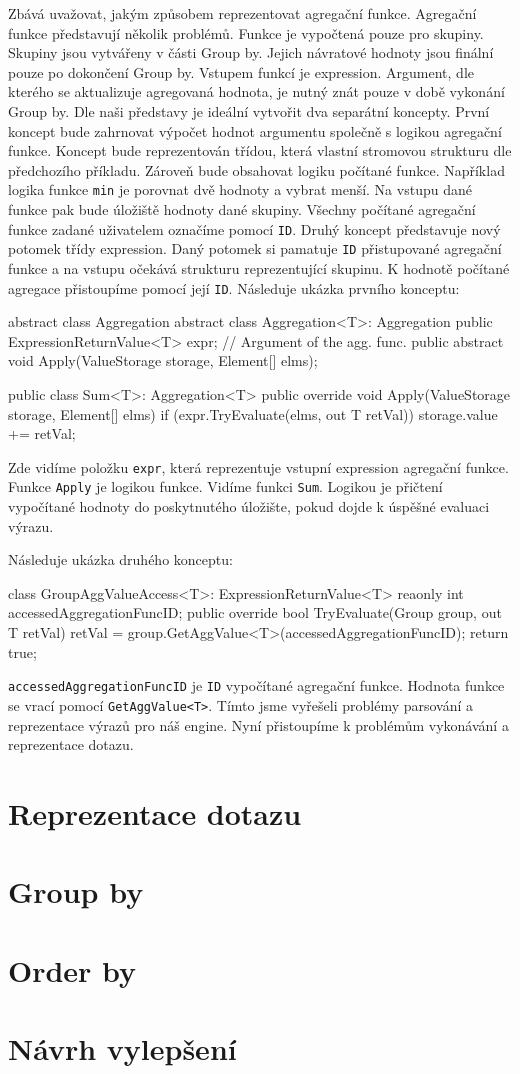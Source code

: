 Zbává uvažovat, jakým způsobem reprezentovat agregační funkce.
Agregační funkce představují několik problémů.
Funkce je vypočtená pouze pro skupiny. 
Skupiny jsou vytvářeny v části Group by.
Jejich návratové hodnoty jsou finální pouze po dokončení Group by. 
Vstupem funkcí je expression.
Argument, dle kterého se aktualizuje agregovaná hodnota, je nutný znát pouze v době vykonání Group by.
Dle naši představy je ideální vytvořit dva separátní koncepty.
První koncept bude zahrnovat výpočet hodnot argumentu společně s logikou agregační funkce.
Koncept bude reprezentován třídou, která vlastní stromovou strukturu dle předchozího příkladu.
Zároveň bude obsahovat logiku počítané funkce.
Například logika funkce \verb+min+ je porovnat dvě hodnoty a vybrat menší.
Na vstupu dané funkce pak bude úložiště hodnoty dané skupiny.
Všechny počítané agregační funkce zadané uživatelem označíme pomocí \verb+ID+.
Druhý koncept představuje nový potomek třídy expression.
Daný potomek si pamatuje \verb+ID+ přistupované agregační funkce a na vstupu očekává strukturu reprezentující skupinu.
K hodnotě počítané agregace přistoupíme pomocí její \verb+ID+.
Následuje ukázka prvního konceptu:
\begin{code}
abstract class Aggregation { }
abstract class Aggregation<T>: Aggregation {
  public ExpressionReturnValue<T> expr; // Argument of the agg. func.
  public abstract void Apply(ValueStorage storage, Element[] elms);
}

public class Sum<T>: Aggregation<T>{
  public override void Apply(ValueStorage storage, Element[] elms) {
    if (expr.TryEvaluate(elms, out T retVal)) {
      storage.value += retVal;
    }
  }
}
\end{code}
Zde vidíme položku \verb+expr+, která reprezentuje vstupní expression agregační funkce.
Funkce \verb+Apply+ je logikou funkce. 
Vidíme funkci \verb+Sum+. 
Logikou je přičtení vypočítané hodnoty do poskytnutého úložište, pokud dojde k úspěšné evaluaci výrazu.

Následuje ukázka druhého konceptu:
\begin{code}
class GroupAggValueAccess<T>: ExpressionReturnValue<T> {
  reaonly int accessedAggregationFuncID; 
  public override bool TryEvaluate(Group group, out T retVal) {
    retVal = group.GetAggValue<T>(accessedAggregationFuncID);
    return true;
  }
}
\end{code}
\verb+accessedAggregationFuncID+ je \verb+ID+ vypočítané agregační funkce.
Hodnota funkce se vrací pomocí \verb+GetAggValue<T>+.
Tímto jsme vyřešeli problémy parsování a reprezentace výrazů pro náš engine.
Nyní přistoupíme k problémům vykonávání a reprezentace dotazu.

\section{Reprezentace dotazu}

\section{Group by}

\section{Order by}

\section{Návrh vylepšení}